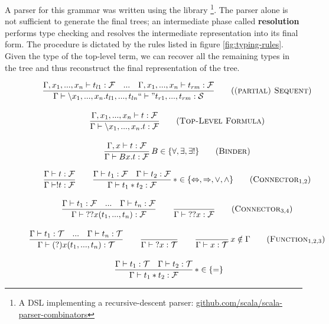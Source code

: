 A parser for this grammar was written using the library \footnote{A DSL implementing a recursive-descent parser: \href{https://github.com/scala/scala-parser-combinators}{github.com/scala/scala-parser-combinators}}. The parser alone is not sufficient to generate the final trees; an intermediate phase called \textbf{resolution} performs type checking and resolves the intermediate representation into its final form. The procedure is dictated by the rules listed in figure \ref{fig:typing-rules}. Given the type of the top-level term, we can recover all the remaining types in the tree and thus reconstruct the final representation of the tree.

\begin{figure}[H]
  \centering
  \begin{framed}
  \begin{gather}
  \frac{\Gamma, x_1, ..., x_n \vdash t_{l1}: \mathcal{F} \quad ... \quad \Gamma, x_1, ..., x_n \vdash t_{rm}: \mathcal{F}}{\Gamma \vdash \backslash x_1, ..., x_n. t_{l1}, ..., t_{ln} ``\vdash" t_{r1}, ..., t_{rm}: \mathcal{S}} \tag{\textsc{(partial) Sequent}} \\[1em]
  \frac{\Gamma, x_1, ..., x_n \vdash t: \mathcal{F}}{\Gamma \vdash \backslash x_1, ..., x_n. t: \mathcal{F}} \tag{\textsc{Top-Level Formula}} \\[1em]
  \frac{\Gamma, x \vdash t: \mathcal{F}}{\Gamma \vdash B x. t: \mathcal{F}} \mkern3mu B \in \{\forall, \exists, \exists!\} \tag{\textsc{Binder}} \\[1em]
  \frac{\Gamma \vdash t: \mathcal{F}}{\Gamma \vdash !t: \mathcal{F}} \quad\quad
  \frac{\Gamma \vdash t_1: \mathcal{F} \quad \Gamma \vdash t_2: \mathcal{F}}{\Gamma \vdash t_1 \ast t_2 : \mathcal{F}} \mkern3mu \ast \in \{\Leftrightarrow, \Rightarrow, \lor, \land\}
  \tag{$\textsc{Connector}_{1,2}$} \\[1em]
  \frac{\Gamma \vdash t_1: \mathcal{F} \quad ... \quad \Gamma \vdash t_n: \mathcal{F}}{\Gamma \vdash {??x}(t_1, ..., t_n) : \mathcal{F}} \quad\quad
  \frac{}{\Gamma \vdash {??x}: \mathcal{F}}
  \tag{$\textsc{Connector}_{3,4}$} \\[1em]
  \frac{\Gamma \vdash t_1: \mathcal{T} \quad ... \quad \Gamma \vdash t_n: \mathcal{T}}{\Gamma \vdash (?)x(t_1, ..., t_n): \mathcal{T}} \quad\quad
  \frac{}{\Gamma \vdash {?x}: \mathcal{T}} \quad\quad
  \frac{}{\Gamma \vdash x: \mathcal{T}} \mkern3mu x \notin \Gamma
  \tag{$\textsc{Function}_{1,2,3}$} \\[1em]
  \frac{\Gamma \vdash t_1: \mathcal{T} \quad \Gamma \vdash t_2: \mathcal{T}}{\Gamma \vdash t_1 \ast t_2: \mathcal{F}} \mkern3mu \ast \in \{=\} \quad\quad

\end{gather}
\end{framed}
\end{figure}
